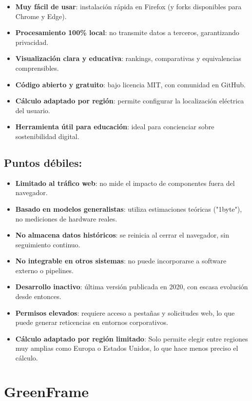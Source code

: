 \documentclass[12pt,a4paper]{report}
\begin{document}
\begin{itemize}
  \item \textbf{Muy fácil de usar}: instalación rápida en Firefox (y forks disponibles para Chrome y Edge).
  \item \textbf{Procesamiento 100\% local}: no transmite datos a terceros, garantizando privacidad.
  \item \textbf{Visualización clara y educativa}: rankings, comparativas y equivalencias comprensibles.
  \item \textbf{Código abierto y gratuito}: bajo licencia MIT, con comunidad en GitHub.
  \item \textbf{Cálculo adaptado por región}: permite configurar la localización eléctrica del usuario.
  \item \textbf{Herramienta útil para educación}: ideal para concienciar sobre sostenibilidad digital.
\end{itemize}

\subsection*{Puntos débiles:}

\begin{itemize}
  \item \textbf{Limitado al tráfico web}: no mide el impacto de componentes fuera del navegador.
  \item \textbf{Basado en modelos generalistas}: utiliza estimaciones teóricas ("1byte"), no mediciones de hardware reales.
  \item \textbf{No almacena datos históricos}: se reinicia al cerrar el navegador, sin seguimiento continuo.
  \item \textbf{No integrable en otros sistemas}: no puede incorporarse a software externo o pipelines.
  \item \textbf{Desarrollo inactivo}: última versión publicada en 2020, con escasa evolución desde entonces.
  \item \textbf{Permisos elevados}: requiere acceso a pestañas y solicitudes web, lo que puede generar reticencias en entornos corporativos.
  \item \textbf{Cálculo adaptado por región limitado}: Solo permite elegir entre regiones muy amplias como Europa o Estados Unidos, lo que hace menos preciso el cálculo.
\end{itemize}

\section*{\textbf{GreenFrame}}
\end{document}
